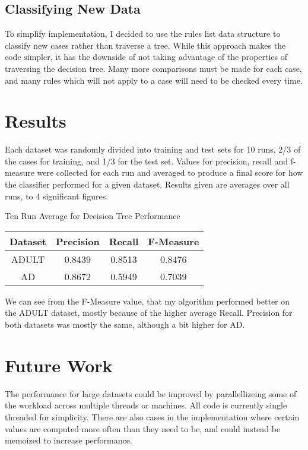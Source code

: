 \documentclass[letterpaper]{article}
\begin{document}
\subsection{Classifying New Data}
To simplify implementation, I decided to use the rules list data structure to 
classify new cases rather than traverse a tree. While this approach makes the 
code simpler, it has the downside of not taking advantage of the properties 
of traversing the decision tree. Many more comparisons must be made for each 
case, and many rules which will not apply to a case will need to be 
checked every time.

\section{Results}
Each dataset was randomly divided into training and test sets for 10 runs, 2/3 of the
cases for training, and 1/3 for the test set.
Values for precision, recall and f-measure were collected for each run and 
averaged to produce a final score for how the classifier 
performed for a given dataset. Results given are averages over all runs, 
to 4 significant figures.

\begin{center}
Ten Run Average for Decision Tree Performance
 \begin{tabular}{||c c c c||}
 \hline
 Dataset & Precision & Recall & F-Measure \\ [0.5ex] 
 \hline\hline
 ADULT & 0.8439 & 0.8513 &  0.8476 \\ 
 \hline
 AD & 0.8672 & 0.5949 &  0.7039 \\
 \hline
\end{tabular}
\end{center}

We can see from the F-Measure value, that my algorithm performed better on the
ADULT dataset, mostly because of the higher average Recall. Precision for both
datasets was mostly the same, although a bit higher for AD.


\section{Future Work}
The performance for large datasets could be improved by parallellizeing some of 
the workload across multiple threads or machines. All code is currently single 
threaded for simplicity. There are also cases in the implementation where 
certain values are computed more often than they need to be, and could instead 
be memoized to increase performance.
\end{document}
